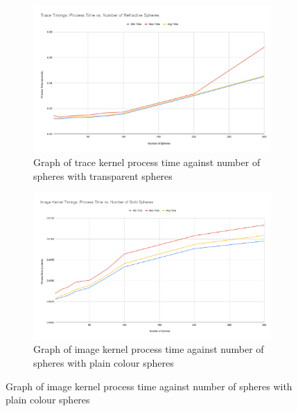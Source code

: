 \documentclass[final]{cmpreport}
\begin{document}
\begin{figure}
    \centering
    \begin{subfigure}{0.5\textwidth}
        \centering
        \includegraphics[width=\linewidth]{img/Trace Timings Process Time vs. Number of Refractive Spheres.png}
        \caption{Graph of trace kernel process time against number of spheres with transparent spheres}
        \label{graphglasssphere}
    \end{subfigure}%
    \begin{subfigure}{0.5\textwidth}
        \centering
        \includegraphics[width=\linewidth]{img/Image Kernel Timings Process Time vs. Number of Solid Spheres.png}
        \caption{Graph of image kernel process time against number of spheres with plain colour spheres}
        \label{graphsolidspheresimagekernel}
    \end{subfigure}
\end{figure}
\end{document}
